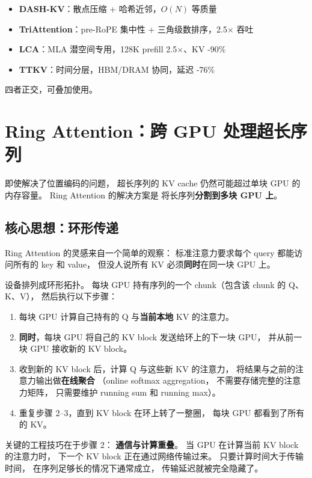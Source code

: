 \begin{keybox}
\begin{itemize}[noitemsep]
  \item \textbf{DASH-KV}：散点压缩 + 哈希近邻，$O(N)$ 等质量
  \item \textbf{TriAttention}：pre-RoPE 集中性 + 三角级数排序，2.5$\times$ 吞吐
  \item \textbf{LCA}：MLA 潜空间专用，128K prefill 2.5$\times$、KV -90\%
  \item \textbf{TTKV}：时间分层，HBM/DRAM 协同，延迟 -76\%
\end{itemize}
四者正交，可叠加使用。
\end{keybox}

\section{Ring Attention：跨 GPU 处理超长序列}

即使解决了位置编码的问题，
超长序列的 KV cache 仍然可能超过单块 GPU 的内存容量。
Ring Attention 的解决方案是
将长序列\textbf{分割到多块 GPU 上}。

\subsection{核心思想：环形传递}

Ring Attention 的灵感来自一个简单的观察：
标准注意力要求每个 query 都能访问所有的 key 和 value，
但没人说所有 KV 必须\textbf{同时}在同一块 GPU 上。

设备排列成环形拓扑。
每块 GPU 持有序列的一个 chunk（包含该 chunk 的 Q、K、V），
然后执行以下步骤：
\begin{enumerate}[noitemsep]
  \item 每块 GPU 计算自己持有的 Q 与\textbf{当前本地} KV 的注意力。
  \item \textbf{同时}，每块 GPU 将自己的 KV block
        发送给环上的下一块 GPU，
        并从前一块 GPU 接收新的 KV block。
  \item 收到新的 KV block 后，计算 Q 与这些新 KV 的注意力，
        将结果与之前的注意力输出做\textbf{在线聚合}
        （online softmax aggregation，
        不需要存储完整的注意力矩阵，
        只需要维护 running sum 和 running max）。
  \item 重复步骤 2--3，直到 KV block 在环上转了一整圈，
        每块 GPU 都看到了所有的 KV。
\end{enumerate}

关键的工程技巧在于步骤 2：
\textbf{通信与计算重叠}。
当 GPU 在计算当前 KV block 的注意力时，
下一个 KV block 正在通过网络传输过来。
只要计算时间大于传输时间，
在序列足够长的情况下通常成立，
传输延迟就被完全隐藏了。

